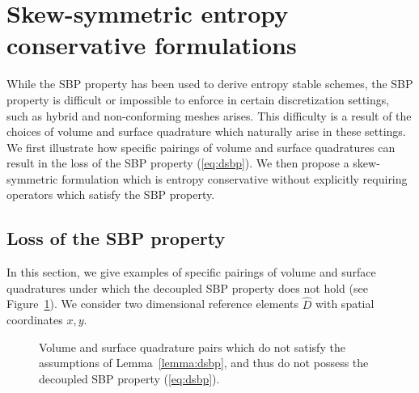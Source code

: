 \documentclass[review]{siamart0216}
\theoremstyle{assumption}
\renewcommand{\hat}[1]{\hat{#1}}
\renewcommand{\hat}{\widehat}
\begin{document}
\section{Skew-symmetric entropy conservative formulations}

While the SBP property has been used to derive entropy stable schemes, the SBP property is difficult or impossible to enforce in certain discretization settings, such as hybrid and non-conforming meshes arises.  This difficulty is a result of the choices of volume and surface quadrature which naturally arise in these settings.  We first illustrate how specific pairings of volume and surface quadratures can result in the loss of the SBP property (\ref{eq:dsbp}).  We then propose a skew-symmetric formulation which is entropy conservative without explicitly requiring operators which satisfy the SBP property.  

\subsection{Loss of the SBP property}

In this section, we give examples of specific pairings of volume and surface quadratures under which the decoupled SBP property does not hold (see Figure~\ref{fig:sbploss}).  We consider two dimensional reference elements $\hat{D}$ with spatial coordinates $x,y$.
\begin{figure}
\centering
{}
\hspace{2em}
\caption{Volume and surface quadrature pairs which do not satisfy the assumptions of Lemma~\ref{lemma:dsbp}, and thus do not possess the decoupled SBP property (\ref{eq:dsbp}). }
\label{fig:sbploss}
\end{figure}
\end{document}
